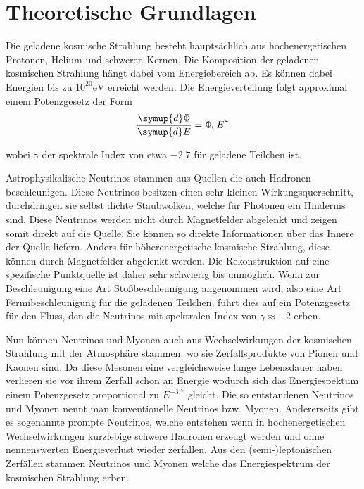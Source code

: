 \section{Theoretische Grundlagen}
\label{sec:theorie}
Die geladene kosmische Strahlung besteht haupts\"achlich aus hochenergetischen Protonen, Helium und schweren Kernen.
Die Komposition der geladenen kosmischen Strahlung h\"angt dabei vom Energiebereich ab.
Es k\"onnen dabei Energien bis zu $10^{20} \si{\electronvolt}$ erreicht werden.
Die Energieverteilung folgt approximal einem Potenzgesetz der Form
\begin{equation*}
  \frac{\symup{d}\Phi}{\symup{d}E} = \Phi_0 E^{\gamma}
\end{equation*}

wobei $\gamma$ der spektrale Index von etwa $-2.7$ f\"ur geladene Teilchen ist.

Astrophysikalische Neutrinos stammen aus Quellen die auch Hadronen beschleunigen.
Diese Neutrinos  besitzen einen sehr kleinen Wirkungsquerschnitt, durchdringen sie selbst dichte Staubwolken, welche f\"ur Photonen ein Hindernis sind.
Diese Neutrinos werden nicht durch Magnetfelder abgelenkt und zeigen somit direkt auf die Quelle.
Sie k\"onnen so direkte Informationen \"uber das Innere der Quelle liefern.
Anders für höherenergetische kosmische Strahlung, diese können durch Magnetfelder abgelenkt werden.
Die Rekonstruktion auf eine spezifische Punktquelle ist daher sehr schwierig bis unmöglich.
Wenn zur Beschleunigung eine Art Sto\ss beschleunigung angenommen wird, also eine Art Fermibeschleunigung f\"ur die geladenen Teilchen, f\"uhrt dies auf ein Potenzgesetz für den Fluss, den die Neutrinos mit spektralen Index von $\gamma \approx -2$ erben.

Nun k\"onnen Neutrinos und Myonen auch aus Wechselwirkungen der kosmischen Strahlung mit der Atmosph\"are stammen, wo sie Zerfallsprodukte von Pionen und Kaonen sind.
 Da diese Mesonen eine vergleichsweise lange Lebensdauer haben verlieren sie vor ihrem Zerfall schon an Energie wodurch sich das Energiespektum einem Potenzgesetz proportional zu $E^{-3.7}$ gleicht.
 Die so entstandenen Neutrinos und Myonen nennt man konventionelle Neutrinos bzw. Myonen.
Andererseits gibt es sogenannte prompte Neutrinos, welche entstehen wenn in hochenergetischen Wechselwirkungen kurzlebige schwere Hadronen erzeugt werden und ohne nennenswerten Energieverlust wieder zerfallen.
Aus den (semi-)leptonischen Zerf\"allen stammen Neutrinos und Myonen welche das  Energiespektrum der kosmischen Strahlung erben.

